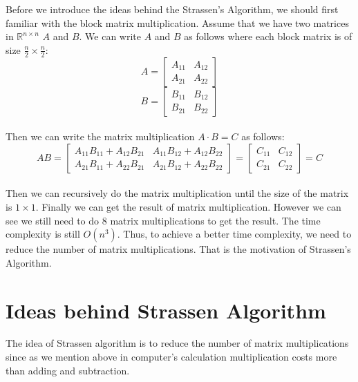 \documentclass{article}
\begin{document}
Before we introduce the ideas behind the Strassen's Algorithm, we should first familiar with the block matrix multiplication. 
Assume that we have two matrices in $\mathbb{R}^{n \times n}$  $A$ and $B$. We can write $A$ and $B$ as follows where each block 
matrix is of size $\frac{n}{2} \times \frac{n}{2}$:
\begin{equation}
A = \begin{bmatrix}
A_{11} & A_{12} \\
A_{21} & A_{22}
\end{bmatrix}
\end{equation}
\begin{equation}
B = \begin{bmatrix}
B_{11} & B_{12} \\
B_{21} & B_{22}
\end{bmatrix}
\end{equation}\\
Then we can write the matrix multiplication $A \cdot B = C$ as follows:
\begin{equation}
AB = \begin{bmatrix}
A_{11}B_{11} + A_{12}B_{21} & A_{11}B_{12} + A_{12}B_{22} \\
A_{21}B_{11} + A_{22}B_{21} & A_{21}B_{12} + A_{22}B_{22}
\end{bmatrix}
= \begin{bmatrix}
C_{11} & C_{12} \\
C_{21} & C_{22}
\end{bmatrix}
= C
\end{equation}\\
Then we can recursively do the matrix multiplication until the size of the matrix is $1 \times 1$. Finally we can get the result of
matrix multiplication. However we can see we still need to do $8$ matrix multiplications to get the result. The time complexity is
still $O(n^3)$. Thus, to achieve a better time complexity, we need to reduce the number of matrix multiplications. That is the motivation
of Strassen's Algorithm.

\section{Ideas behind Strassen Algorithm}
\hspace{5.5mm}The idea of Strassen algorithm is to reduce the number of matrix multiplications since as we mention above in computer's calculation 
multiplication costs more than adding and subtraction.\\
\end{document}
